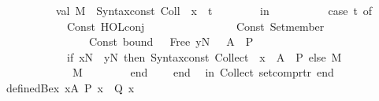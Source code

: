 \begin{isabellebody}
\ \ \ \ \ \ \ \ \ \ val\ M\ {\isacharequal}{\kern0pt}\ Syntax{\isachardot}{\kern0pt}const\ \isactrlsyntaxUNDERSCOREconst {\isasymopen}{\isacharunderscore}{\kern0pt}Coll{\isasymclose}\ {\isachardollar}{\kern0pt}\ x\ {\isachardollar}{\kern0pt}\ t{\isacharsemicolon}{\kern0pt}\isanewline
\ \ \ \ \ \ \ \ in\isanewline
\ \ \ \ \ \ \ \ \ \ case\ t\ of\isanewline
\ \ \ \ \ \ \ \ \ \ \ \ Const\ {\isacharparenleft}{\kern0pt}\isactrlconstUNDERSCOREsyntax {\isasymopen}HOL{\isachardot}{\kern0pt}conj{\isasymclose}{\isacharcomma}{\kern0pt}\ {\isacharunderscore}{\kern0pt}{\isacharparenright}{\kern0pt}\ {\isachardollar}{\kern0pt}\isanewline
\ \ \ \ \ \ \ \ \ \ \ \ \ \ {\isacharparenleft}{\kern0pt}Const\ {\isacharparenleft}{\kern0pt}\isactrlconstUNDERSCOREsyntax {\isasymopen}Set{\isachardot}{\kern0pt}member{\isasymclose}{\isacharcomma}{\kern0pt}\ {\isacharunderscore}{\kern0pt}{\isacharparenright}{\kern0pt}\ {\isachardollar}{\kern0pt}\isanewline
\ \ \ \ \ \ \ \ \ \ \ \ \ \ \ \ {\isacharparenleft}{\kern0pt}Const\ {\isacharparenleft}{\kern0pt}\isactrlsyntaxUNDERSCOREconst {\isasymopen}{\isacharunderscore}{\kern0pt}bound{\isasymclose}{\isacharcomma}{\kern0pt}\ {\isacharunderscore}{\kern0pt}{\isacharparenright}{\kern0pt}\ {\isachardollar}{\kern0pt}\ Free\ {\isacharparenleft}{\kern0pt}yN{\isacharcomma}{\kern0pt}\ {\isacharunderscore}{\kern0pt}{\isacharparenright}{\kern0pt}{\isacharparenright}{\kern0pt}\ {\isachardollar}{\kern0pt}\ A{\isacharparenright}{\kern0pt}\ {\isachardollar}{\kern0pt}\ P\ {\isacharequal}{\kern0pt}{\isachargreater}{\kern0pt}\isanewline
\ \ \ \ \ \ \ \ \ \ \ \ if\ xN\ {\isacharequal}{\kern0pt}\ yN\ then\ Syntax{\isachardot}{\kern0pt}const\ \isactrlsyntaxUNDERSCOREconst {\isasymopen}{\isacharunderscore}{\kern0pt}Collect{\isasymclose}\ {\isachardollar}{\kern0pt}\ x\ {\isachardollar}{\kern0pt}\ A\ {\isachardollar}{\kern0pt}\ P\ else\ M\isanewline
\ \ \ \ \ \ \ \ \ \ {\isacharbar}{\kern0pt}\ {\isacharunderscore}{\kern0pt}\ {\isacharequal}{\kern0pt}{\isachargreater}{\kern0pt}\ M\isanewline
\ \ \ \ \ \ \ \ end\isanewline
\ \ \ \ end{\isacharsemicolon}{\kern0pt}\isanewline
\ \ in\ {\isacharbrackleft}{\kern0pt}{\isacharparenleft}{\kern0pt}\isactrlconstUNDERSCOREsyntax {\isasymopen}Collect{\isasymclose}{\isacharcomma}{\kern0pt}\ setcompr{\isacharunderscore}{\kern0pt}tr{\isacharprime}{\kern0pt}{\isacharparenright}{\kern0pt}{\isacharbrackright}{\kern0pt}\ end\isanewline
{\isacartoucheclose}\isanewline
\isanewline
{}\isamarkupfalse%
\ defined{\isacharunderscore}{\kern0pt}Bex\ {\isacharparenleft}{\kern0pt}{\isachardoublequoteopen}{\isasymexists}x{\isasymin}A{\isachardot}{\kern0pt}\ P\ x\ {\isasymand}\ Q\ x{\isachardoublequoteclose}{\isacharparenright}{\kern0pt}\ {\isacharequal}{\kern0pt}\ {\isacartoucheopen}\isanewline

\end{isabellebody}
